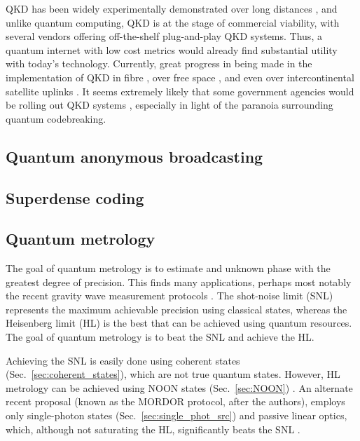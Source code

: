 \documentclass[aps,rmp,twocolumn,amsmath,amssymb,nofootinbib,superscriptaddress,longbibliography,floatfix]{revtex4-1}
\newcommand{\comment}[1]{{\color{blue}{\textbf{#1}}}}
\begin{document}
QKD has been widely experimentally demonstrated over long distances \cite{bib:Muller96}, and unlike quantum computing, QKD is at the stage of commercial viability, with several vendors offering off-the-shelf plug-and-play QKD systems. Thus, a quantum internet with low cost metrics would already find substantial utility with today's technology. Currently, great progress in being made in the implementation of QKD in fibre \cite{???}, over free space \cite{bib:Buttler00}, and even over intercontinental satellite uplinks \cite{JWP}. It seems extremely likely that some government agencies would be rolling out QKD systems \cite{bib:Secret}, especially in light of the paranoia surrounding quantum codebreaking.

%
%

\subsection{Quantum anonymous broadcasting} \label{sec:anon_broad}

\cite{Wehner}

\comment{Ryan TO DO}

%
%

\subsection{Superdense coding}

\cite{???}

\comment{Ryan to do}

%
%

\subsection{Quantum metrology} \label{sec:metrology}

The goal of quantum metrology is to estimate and unknown phase with the greatest degree of precision. This finds many applications, perhaps most notably the recent gravity wave measurement protocols \cite{???}. The shot-noise limit (SNL) represents the maximum achievable precision using classical states, whereas the Heisenberg limit (HL) is the best that can be achieved using quantum resources. The goal of quantum metrology is to beat the SNL and achieve the HL.

Achieving the SNL is easily done using coherent states (Sec.~\ref{sec:coherent_states}), which are not true quantum states. However, HL metrology can be achieved using NOON states (Sec.~\ref{sec:NOON}) \cite{bib:Dowling08}. An alternate recent proposal (known as the MORDOR protocol, after the authors), employs only single-photon states (Sec.~\ref{sec:single_phot_src}) and passive linear optics, which, although not saturating the HL, significantly beats the SNL \cite{MORDOR, MORDOR2}.
\end{document}
